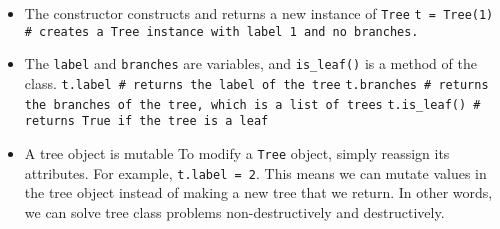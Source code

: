 \vspace{2mm}
\begin{itemize}
\item The constructor constructs and returns a new instance of \lstinline{Tree}
    \subitem \lstinline{t = Tree(1) # creates a Tree instance with label 1 and no branches.}
\item The \lstinline{label} and \lstinline{branches} are variables, and \lstinline{is_leaf()} is a method of the class.
    \subitem \lstinline{t.label # returns the label of the tree}
    \subitem \lstinline{t.branches # returns the branches of the tree, which is a list of trees}
    \subitem \lstinline{t.is_leaf() # returns True if the tree is a leaf}
\item A tree object is mutable
    \subitem To modify a \lstinline{Tree} object, simply reassign its attributes. For example, \lstinline{t.label = 2}.
    \subitem This means we can mutate values in the tree object instead of making a new tree that we return. In other words, we can solve tree class problems non-destructively and destructively.
\end{itemize}
